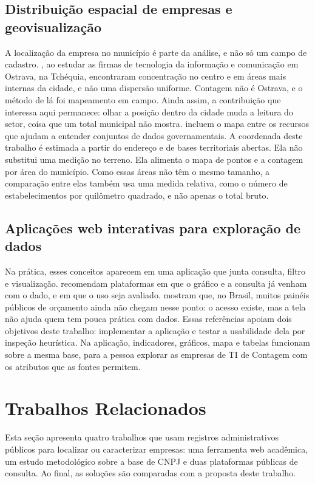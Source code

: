 \subsection{Distribuição espacial de empresas e geovisualização}

A localização da empresa no município é parte da análise, e não só um campo de cadastro.
, ao estudar as firmas de tecnologia da informação e comunicação em Ostrava, na Tchéquia, encontraram concentração no centro e em áreas mais internas da cidade, e não uma dispersão uniforme.
Contagem não é Ostrava, e o método de lá foi mapeamento em campo.
Ainda assim, a contribuição que interessa aqui permanece: olhar a posição dentro da cidade muda a leitura do setor, coisa que um total municipal não mostra.
 incluem o mapa entre os recursos que ajudam a entender conjuntos de dados governamentais.
A coordenada deste trabalho é estimada a partir do endereço e de bases territoriais abertas.
Ela não substitui uma medição no terreno.
Ela alimenta o mapa de pontos e a contagem por área do município.
Como essas áreas não têm o mesmo tamanho, a comparação entre elas também usa uma medida relativa, como o número de estabelecimentos por quilômetro quadrado, e não apenas o total bruto.

\subsection{Aplicações web interativas para exploração de dados}

Na prática, esses conceitos aparecem em uma aplicação que junta consulta, filtro e visualização.
 recomendam plataformas em que o gráfico e a consulta já venham com o dado, e em que o uso seja avaliado.
 mostram que, no Brasil, muitos painéis públicos de orçamento ainda não chegam nesse ponto: o acesso existe, mas a tela não ajuda quem tem pouca prática com dados.
Essas referências apoiam dois objetivos deste trabalho: implementar a aplicação e testar a usabilidade dela por inspeção heurística.
Na aplicação, indicadores, gráficos, mapa e tabelas funcionam sobre a mesma base, para a pessoa explorar as empresas de TI de Contagem com os atributos que as fontes permitem.

\section{Trabalhos Relacionados}

Esta seção apresenta quatro trabalhos que usam registros administrativos públicos para localizar ou caracterizar empresas: uma ferramenta web acadêmica, um estudo metodológico sobre a base de CNPJ e duas plataformas públicas de consulta.
Ao final, as soluções são comparadas com a proposta deste trabalho.

